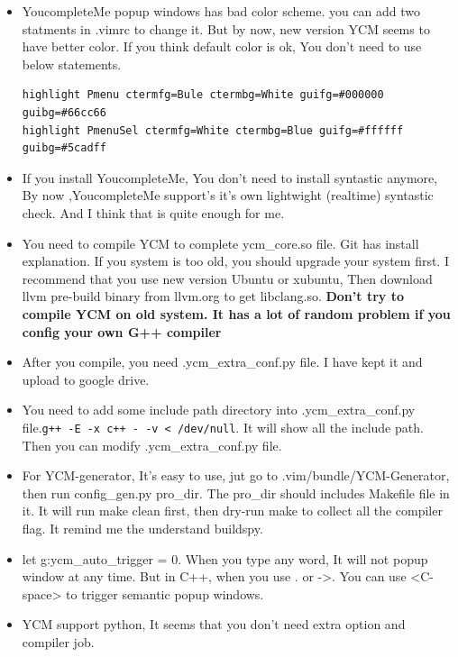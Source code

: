 \documentclass[a4paper,12pt,twoside]{book}
\begin{document}
\begin{itemize}
\begin{itemize}
\item YoucompleteMe popup windows has bad color scheme. you can add two statments in .vimrc to change it. But by now, new version YCM seems to have better color. If you think default color is ok, You don't need to use below statements. 
\begin{verbatim}
highlight Pmenu ctermfg=Bule ctermbg=White guifg=#000000 guibg=#66cc66
highlight PmenuSel ctermfg=White ctermbg=Blue guifg=#ffffff guibg=#5cadff
\end{verbatim}

\item If you install YoucompleteMe, You don't need to install syntastic anymore, By now ,YoucompleteMe support's it's own lightwight (realtime) syntastic check. And I think that is quite enough for me.  

\item You need to compile YCM to complete ycm\_core.so file. Git has install explanation. If you system is too old, you should upgrade your system first. I recommend that you use new version Ubuntu or xubuntu, Then download llvm pre-build binary from llvm.org to get libclang.so. \textbf{Don't try to compile YCM on old system. It has a lot of random problem if you config your own G++ compiler}

\item After you compile, you need .ycm\_extra\_conf.py file. I have kept it and upload to google drive.

\item You need to add some include path directory into .ycm\_extra\_conf.py file.\verb=g++ -E -x c++ - -v < /dev/null=. It will show all the include path. Then you can modify .ycm\_extra\_conf.py file.

\item For YCM-generator, It's easy to use, jut go to .vim/bundle/YCM-Generator, then run config\_gen.py pro\_dir. The pro\_dir should includes Makefile file in it.  It will run make clean first, then dry-run make to collect all the compiler flag. It remind me the understand buildspy. 

\item let g:ycm\_auto\_trigger = 0. When you type any word, It will not popup window at any time. But in C++, when you use . or ->. You can use <C-space> to trigger semantic popup windows.

\item YCM support python, It seems that you don't need extra option and compiler job.		


\end{itemize}
\end{itemize}
\end{document}
